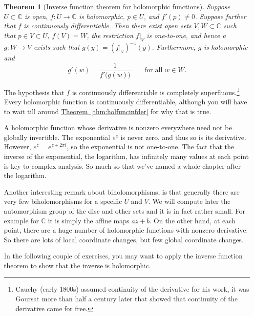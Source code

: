 \documentclass[12pt,openany]{book}
\newcommand{\C}{{\mathbb{C}}}
\theoremstyle{plain}
\newtheorem{thm}{Theorem}[section]
\theoremstyle{remark}
\theoremstyle{definition}
\theoremstyle{exercise}
\theoremstyle{example}
\newcommand{\thmref}[1]{\hyperref[#1]{Theorem~\ref*{#1}}}
\begin{document}
\begin{thm}[Inverse function theorem for holomorphic functions]
\label{thm:inversehol}
Suppose $U \subset \C$ is open, $f \colon U \to \C$ is holomorphic,
$p \in U$, and $f'(p) \not= 0$.  Suppose further that $f$ is continuously
differentiable.
Then there exist open sets $V, W \subset \C$ such that
$p \in V \subset U$, $f(V) = W$, the restriction $f|_V$ is one-to-one,
and hence a $g \colon W \to V$ exists such that
$g(y) = (f|_V)^{-1}(y)$.
Furthermore, $g$ is holomorphic and
\begin{equation*}
g'(w) = \frac{1}{f'\bigl(g(w)\bigr)} \qquad \text{for all $w \in W$}.
\end{equation*}
\end{thm}

The hypothesis that $f$ is continuously differentiable is completely
superfluous.\footnote{Cauchy (early 1800s)
assumed continuity of the derivative for his work, it was
Goursat more than half a century later that showed that continuity of the
derivative came for free.}
Every holomorphic function is continuously
differentiable, although you will have to wait till around
\thmref{thm:holfuncinfder} for why that is true.

A holomorphic function whose derivative is nonzero
everywhere need not be globally invertible.  The exponential $e^z$
is never zero, and thus so is its derivative.  However, $e^{z} = e^{z+2\pi i}$,
so the
exponential is not one-to-one.
The fact that the inverse of the
exponential, the logarithm,
has infinitely many values at each point is key to complex analysis.  So
much so that we've named a whole chapter after the logarithm.

Another interesting remark about biholomorphisms, is that generally
there are very few biholomorphisms for a specific $U$ and $V$.  We will
compute later the automorphism group of the disc and other sets and it is
in fact rather small.  For example for $\C$ it is simply the affine maps $a
z + b$.  On the other hand, at each point, there are a huge number of
holomorphic functions with nonzero derivative.  So there are lots of local
coordinate changes, but few global coordinate changes.

In the following couple of exercises, you may want to apply the inverse
function theorem to show that the inverse is holomorphic.
\end{document}
